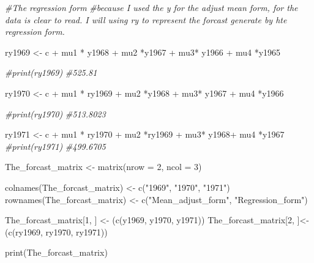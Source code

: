 \documentclass[
]{article}
\newenvironment{Shaded}{\begin{snugshade}}{\end{snugshade}}
\newcommand{\AttributeTok}[1]{\textcolor[rgb]{0.77,0.63,0.00}{#1}}
\newcommand{\CommentTok}[1]{\textcolor[rgb]{0.56,0.35,0.01}{\textit{#1}}}
\newcommand{\DecValTok}[1]{\textcolor[rgb]{0.00,0.00,0.81}{#1}}
\newcommand{\FunctionTok}[1]{\textcolor[rgb]{0.00,0.00,0.00}{#1}}
\newcommand{\NormalTok}[1]{#1}
\newcommand{\OtherTok}[1]{\textcolor[rgb]{0.56,0.35,0.01}{#1}}
\newcommand{\SpecialCharTok}[1]{\textcolor[rgb]{0.00,0.00,0.00}{#1}}
\newcommand{\StringTok}[1]{\textcolor[rgb]{0.31,0.60,0.02}{#1}}
\begin{document}
\begin{Shaded}
\begin{Highlighting}[]
\CommentTok{\#The regression form }
\CommentTok{\#because I used the y for the adjust mean form, for the data is clear to read. I will using ry to represent the forcast generate by hte regression form.}

\NormalTok{ry1969 }\OtherTok{\textless{}{-}}\NormalTok{ c }\SpecialCharTok{+}\NormalTok{ mu1 }\SpecialCharTok{*}\NormalTok{ y1968 }\SpecialCharTok{+}\NormalTok{ mu2 }\SpecialCharTok{*}\NormalTok{y1967 }\SpecialCharTok{+}\NormalTok{ mu3}\SpecialCharTok{*}\NormalTok{ y1966 }\SpecialCharTok{+}\NormalTok{ mu4 }\SpecialCharTok{*}\NormalTok{y1965}

\CommentTok{\#print(ry1969)}
\CommentTok{\#525.81}

\NormalTok{ry1970 }\OtherTok{\textless{}{-}}\NormalTok{ c }\SpecialCharTok{+}\NormalTok{ mu1 }\SpecialCharTok{*}\NormalTok{ ry1969 }\SpecialCharTok{+}\NormalTok{ mu2 }\SpecialCharTok{*}\NormalTok{y1968 }\SpecialCharTok{+}\NormalTok{ mu3}\SpecialCharTok{*}\NormalTok{ y1967 }\SpecialCharTok{+}\NormalTok{ mu4 }\SpecialCharTok{*}\NormalTok{y1966}

\CommentTok{\#print(ry1970)}
\CommentTok{\#513.8023}


\NormalTok{ry1971 }\OtherTok{\textless{}{-}}\NormalTok{ c }\SpecialCharTok{+}\NormalTok{ mu1 }\SpecialCharTok{*}\NormalTok{ ry1970 }\SpecialCharTok{+}\NormalTok{ mu2 }\SpecialCharTok{*}\NormalTok{ry1969 }\SpecialCharTok{+}\NormalTok{ mu3}\SpecialCharTok{*}\NormalTok{ y1968}\SpecialCharTok{+}\NormalTok{ mu4 }\SpecialCharTok{*}\NormalTok{y1967}
\CommentTok{\#print(ry1971)}
\CommentTok{\#499.6705}

\NormalTok{The\_forcast\_matrix }\OtherTok{\textless{}{-}} \FunctionTok{matrix}\NormalTok{(}\AttributeTok{nrow =} \DecValTok{2}\NormalTok{, }\AttributeTok{ncol =} \DecValTok{3}\NormalTok{)}


\FunctionTok{colnames}\NormalTok{(The\_forcast\_matrix) }\OtherTok{\textless{}{-}} \FunctionTok{c}\NormalTok{(}\StringTok{"1969"}\NormalTok{, }\StringTok{"1970"}\NormalTok{, }\StringTok{"1971"}\NormalTok{)}
\FunctionTok{rownames}\NormalTok{(The\_forcast\_matrix) }\OtherTok{\textless{}{-}} \FunctionTok{c}\NormalTok{(}\StringTok{"Mean\_adjust\_form"}\NormalTok{, }\StringTok{"Regression\_form"}\NormalTok{)}

\NormalTok{The\_forcast\_matrix[}\DecValTok{1}\NormalTok{, ] }\OtherTok{\textless{}{-}}\NormalTok{ (}\FunctionTok{c}\NormalTok{(y1969, y1970, y1971))}
\NormalTok{The\_forcast\_matrix[}\DecValTok{2}\NormalTok{, ]}\OtherTok{\textless{}{-}}\NormalTok{ (}\FunctionTok{c}\NormalTok{(ry1969, ry1970, ry1971))}

\FunctionTok{print}\NormalTok{(The\_forcast\_matrix)}
\end{Highlighting}
\end{Shaded}
\end{document}
